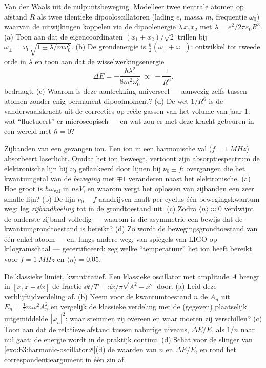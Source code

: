 \begin{exercise}[$\star\star\star$]\label{exo:b3:harmonic-oscillator:10}
Van der Waals uit de nulpuntsbeweging. Modelleer twee neutrale atomen op
afstand $R$ als twee identieke dipooloscillatoren (lading $e$, massa $m$,
frequentie $\omega_0$) waarvan de uitwijkingen koppelen via de
dipoolenergie $\lambda\,x_1x_2$ met $\lambda = e^2/2\pi\varepsilon_0R^3$.
(a) Toon aan dat de eigencoördinaten $(x_1 \pm x_2)/\sqrt2$ trillen bij
$\omega_\pm = \omega_0\sqrt{1 \pm \lambda/m\omega_0^2}$. (b) De
grondenergie is $\tfrac\hbar2(\omega_+ + \omega_-)$: ontwikkel tot tweede
orde in $\lambda$ en toon aan dat de wisselwerkingsenergie
\[
\Delta E = -\frac{\hbar\lambda^2}{8m^2\omega_0^3}
\ \propto\ -\frac{1}{R^6} .
\]
bedraagt. (c) Waarom is deze aantrekking universeel --- aanwezig zelfs
tussen atomen zonder enig permanent dipoolmoment? (d) De wet $1/R^6$ is de
vanderwaalskracht uit de correcties op reële gassen van het volume van
jaar 1: wat ``fluctueert'' er microscopisch --- en wat zou er met deze
kracht gebeuren in een wereld met $\hbar = 0$?
\end{exercise}

\begin{exercise}[$\star\star\star$]\label{exo:b3:harmonic-oscillator:11}
Zijbanden van een gevangen ion. Een ion in een harmonische val ($f =
\qty{1}{MHz}$) absorbeert laserlicht. Omdat het ion beweegt, vertoont zijn
absorptiespectrum de elektronische lijn bij $\nu_0$ geflankeerd door
lijnen bij $\nu_0 \pm f$: overgangen die het kwantumgetal van de
\emph{beweging} met $\mp1$ veranderen naast het elektronische. (a) Hoe
groot is $\hbar\omega_{\text{val}}$ in $\unit{neV}$, en waarom vergt het
oplossen van zijbanden een zeer smalle lijn? (b) De lijn $\nu_0 - f$
aandrijven haalt per cyclus één bewegingskwantum weg: leg
\emph{zijbandkoeling} tot in de grondtoestand uit. (c) Zodra $\langle n\rangle \approx
0$ verdwijnt de onderste zijband volledig --- waarom is
die asymmetrie een bewijs dat de kwantumgrondtoestand is bereikt? (d) Zo
wordt de bewegingsgrondtoestand van één enkel atoom --- en, langs andere
weg, van spiegels van LIGO op kilogramschaal --- gecertificeerd: zeg welke
``temperatuur'' het ion heeft bereikt voor $f = \qty{1}{MHz}$ en $\langle n\rangle = 0.05$.
\end{exercise}

\begin{exercise}[$\star\star\star$]\label{exo:b3:harmonic-oscillator:12}
De klassieke limiet, kwantitatief. Een klassieke oscillator met amplitude
$A$ brengt in $[x, x + \dd x]$ de fractie $\dd
t/T = \dd x/\pi\sqrt{A^2 - x^2}$ door. (a) Leid deze verblijftijdverdeling af. (b) Neem voor de
kwantumtoestand $n$ de $A_n$ uit $E_n =
\tfrac12 m\omega^2A_n^2$ en
vergelijk de klassieke verdeling met de (gegeven) plaatselijk uitgemiddelde
$|\varphi_n|^2$: waar stemmen zij overeen en waar moeten zij verschillen?
(c) Toon aan dat de relatieve afstand tussen naburige niveaus, $\Delta E/E$, als $1/n$ naar nul gaat: de energie wordt in de praktijk continu.
(d) Schat voor de slinger van \cref{exo:b3:harmonic-oscillator:8}(d) de
waarden van $n$ en $\Delta
E/E$, en rond het correspondentieargument in
één zin af.
\end{exercise}

